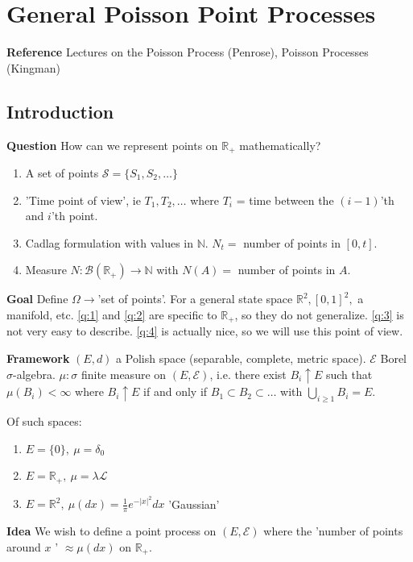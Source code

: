 \chapter{General Poisson Point Processes}
\textbf{Reference} Lectures on the Poisson Process (Penrose), Poisson Processes (Kingman)

\section{Introduction}
\textbf{Question} How can we represent points on $\mathbb{R}_+$ mathematically?
\begin{enumerate}
	\item A set of points $\mathcal{S}=\{S_1, S_2, \ldots \}$ \label{q:3}
	\item 'Time point of view', ie $T_1,T_2, \ldots $ where $T_i$ = time between the $(i-1) $'th and $i $'th point. \label{q:1}
	\item Cadlag formulation with values in $ \mathbb{N}$. $N_t=$ number of points in $[0,t]$. \label{q:2}
	\item Measure $N: \mathcal{B}(\mathbb{R}_+) \to \mathbb{N}$ with $N(A)=$ number of points in $A$. \label{q:4}
\end{enumerate}
\textbf{Goal} Define $\Omega \to $'set of points'. For a general state space $\mathbb{R}^2, [0,1]^2,$ a manifold, etc. 
\ref{q:1} and \ref{q:2} are specific to $\mathbb{R}_+$, so they do not generalize. \ref{q:3} is not very easy to describe. \ref{q:4} is actually nice, so we will  use this point of view.

\textbf{Framework} $(E,d)$ a Polish space (separable, complete, metric space). $\mathcal{E}$ Borel $\sigma$-algebra. $\mu: \sigma$ finite measure on $(E, \mathcal{E})$, i.e. there exist $B_i \uparrow E$ such that $\mu(B_i)<\infty$ where $B_i \uparrow E$ if and only if $B_1 \subset B_2 \subset \ldots$ with $\bigcup_{i\geq 1}B_i=E$.

\begin{ex}[] Of such spaces: 
\begin{enumerate}
	\item $E=\{0\},\ \mu = \delta_0$
	\item $E=\mathbb{R}_+,\ \mu = \lambda \mathcal{L}$
	\item $E=\mathbb{R}^2,\ \mu(dx)=\frac{1}{\pi} e^{- |x|^2}dx$ 'Gaussian'
\end{enumerate}
\end{ex}

\textbf{Idea} We wish to define a point process on $(E, \mathcal{E})$ where the 'number of points around $x$ ' $\approx \mu(dx)$ on $\mathbb{R}_+$. 

